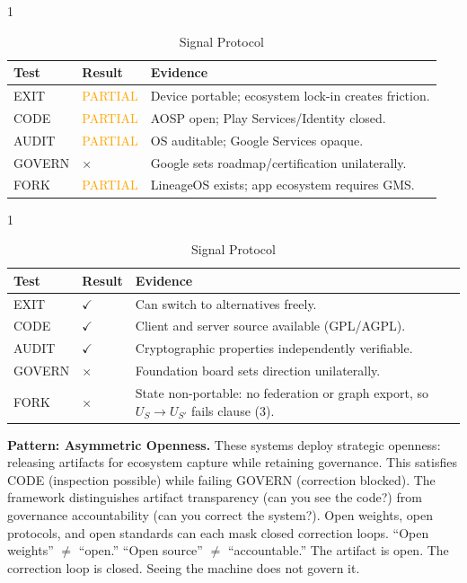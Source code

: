 \documentclass{article}
\begin{document}
\begin{table}[htbp]
    \begin{subtable}{1\textwidth}
        \centering
        \caption{Android (AOSP + GMS)}
        \begin{tabular}{@{}llp{7cm}@{}}
            \toprule
            \textbf{Test} & \textbf{Result} & \textbf{Evidence} \\
            \midrule
            EXIT & \textcolor{orange}{PARTIAL} & Device portable; ecosystem lock-in creates friction. \\
            CODE & \textcolor{orange}{PARTIAL} & AOSP open; Play Services/Identity closed. \\
            AUDIT & \textcolor{orange}{PARTIAL} & OS auditable; Google Services opaque. \\
            GOVERN & $\times$ & Google sets roadmap/certification unilaterally. \\
            FORK & \textcolor{orange}{PARTIAL} & LineageOS exists; app ecosystem requires GMS. \\
            \bottomrule
        \end{tabular}
    \end{subtable}

    \begin{subtable}{1\textwidth}
        \centering
        \caption{Signal Protocol}
        \begin{tabular}{@{}llp{7cm}@{}}
            \toprule
            \textbf{Test} & \textbf{Result} & \textbf{Evidence} \\
            \midrule
            EXIT & $\checkmark$ & Can switch to alternatives freely. \\
            CODE & $\checkmark$ & Client and server source available (GPL/AGPL). \\
            AUDIT & $\checkmark$ & Cryptographic properties independently verifiable. \\
            GOVERN & $\times$ & Foundation board sets direction unilaterally. \\
            FORK & $\times$ & State non-portable: no federation or graph export, so $U_S \to U_{S'}$ fails clause (3). \\
            \bottomrule
        \end{tabular}
    \end{subtable}
\end{table}

\textbf{Pattern: Asymmetric Openness.} These systems deploy strategic openness: releasing artifacts for ecosystem capture while retaining governance. This satisfies CODE (inspection possible) while failing GOVERN (correction blocked). The framework distinguishes artifact transparency (can you see the code?) from governance accountability (can you correct the system?). Open weights, open protocols, and open standards can each mask closed correction loops. ``Open weights'' $\neq$ ``open.'' ``Open source'' $\neq$ ``accountable.'' The artifact is open. The correction loop is closed. Seeing the machine does not govern it.
\end{document}
